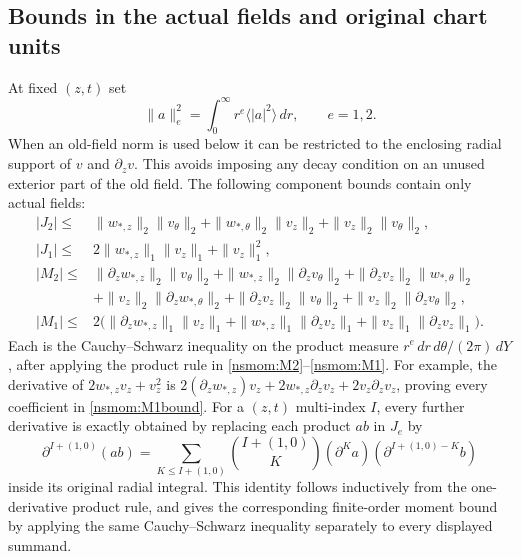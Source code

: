 \documentclass[11pt]{article}
\begin{document}
\subsection{Bounds in the actual fields and original chart units}
\label{nsmom:bounds}
At fixed $(z,t)$ set
\[
 \|a\|_e^2=\int_0^\infty r^e\langle|a|^2\rangle\,dr,
 \qquad e=1,2.
\]
When an old-field norm is used below it can be restricted to the
enclosing radial support of $v$ and $\partial_zv$. This avoids imposing
any decay condition on an unused exterior part of the old field.
The following component bounds contain only actual fields:
\begin{align}
 |J_2|\le{}&\|w_{*,z}\|_2\|v_\theta\|_2
 +\|w_{*,\theta}\|_2\|v_z\|_2+\|v_z\|_2\|v_\theta\|_2,
 \label{nsmom:J2bound}\\
 |J_1|\le{}&2\|w_{*,z}\|_1\|v_z\|_1+\|v_z\|_1^2,
 \label{nsmom:J1bound}\\
 |M_2|\le{}&\|\partial_z w_{*,z}\|_2\|v_\theta\|_2
 +\|w_{*,z}\|_2\|\partial_zv_\theta\|_2
 +\|\partial_zv_z\|_2\|w_{*,\theta}\|_2\nonumber\\
 &+\|v_z\|_2\|\partial_z w_{*,\theta}\|_2
 +\|\partial_zv_z\|_2\|v_\theta\|_2
 +\|v_z\|_2\|\partial_zv_\theta\|_2,
 \label{nsmom:M2bound}\\
 |M_1|\le{}&2\bigl(\|\partial_z w_{*,z}\|_1\|v_z\|_1
 +\|w_{*,z}\|_1\|\partial_zv_z\|_1
 +\|v_z\|_1\|\partial_zv_z\|_1\bigr).
 \label{nsmom:M1bound}
\end{align}
Each is the Cauchy--Schwarz inequality on the product measure
$r^e\,dr\,d\theta/(2\pi)\,dY$, after applying the product rule in
\eqref{nsmom:M2}--\eqref{nsmom:M1}. For example, the derivative of
$2w_{*,z}v_z+v_z^2$ is
$2(\partial_z w_{*,z})v_z+2w_{*,z}\partial_zv_z+
2v_z\partial_zv_z$, proving every coefficient in
\eqref{nsmom:M1bound}.
For a $(z,t)$ multi-index $I$, every further derivative is exactly
obtained by replacing each product $ab$ in $J_e$ by
\[
 \partial^{I+(1,0)}(ab)
 =\sum_{K\le I+(1,0)}\binom{I+(1,0)}{K}
       (\partial^Ka)(\partial^{I+(1,0)-K}b)
\]
inside its original radial integral. This identity follows inductively
from the one-derivative product rule, and gives the corresponding
finite-order moment bound by applying the same Cauchy--Schwarz
inequality separately to every displayed summand.
\end{document}

